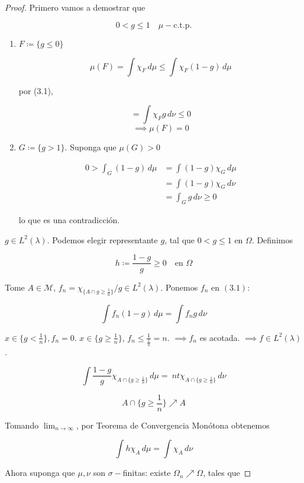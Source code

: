\begin{proof}
    Primero vamos a demostrar que 

    \[0<g\leq 1\quad \mu-\text{c.t.p.}\]

    \begin{enumerate}[label=(\alph*)]
        \item $F\coloneqq \{g\leq 0\}$
        
        \[\mu(F)=\int \chi_F\,d\mu\leq \int \chi_F (1-g)\,d\mu\]

        por (3.1), 

        \[=\int\chi_F g\,d\nu\leq 0\]
        \[\implies \mu(F)=0\]

        \item $G\coloneqq \{g>1\}$. Suponga que $\mu(G)>0$
        
        \begin{align*}
            0>\int_G (1-g)\,d\mu&=\int (1-g)\chi_G\,d\mu\\
            &=\int (1-g)\chi_G\,d\nu\\
            &=\int_G g\,d\nu\geq 0
        \end{align*}

        lo que es una contradicción.

    \end{enumerate}

    $g\in L^2(\lambda)$. Podemos elegir representante $g$, tal que $0<g\leq 1$ en $\Omega$. Definimos 

    \[h\coloneqq \frac{1-g}{g}\geq 0\quad \text{en }\Omega\]

    Tome $A\in\mathcal{M}$, $f_n=\chi_{\{A\cap g\geq \frac{1}{n}\}}/g\in L^2(\lambda)$. Ponemos $f_n$ en $(3.1)$:

    \[\int f_n(1-g)\,d\mu=\int f_ng\,d\nu\]

    $x\in \{g<\frac{1}{n}\},f_n=0$. $x\in \{g\geq \frac{1}{n}\}$, $f_n\leq \frac{1}{\frac{1}{n}}=n$. $\implies f_n$ es acotada. $\implies f\in L^2(\lambda)$.

    \[\int \frac{1-g}{g}\chi_{A\cap\{g\geq \frac{1}{n}\}}\,d\mu=\ nt \chi_{A\cap \{g\geq \frac{1}{n}\}}\,d\nu\]

    \[A\cap\{g\geq\frac{1}{n}\}\nearrow A\]

    Tomando $\lim_{n\to\infty}$, por Teorema de Convergencia Monótona obtenemos 

    \[\int h\chi_A\,d\mu=\int\chi_A\,d\nu\]

    Ahora suponga que $\mu,\nu$ son $\sigma-$finitas: existe $\Omega_n\nearrow \Omega$, tales que 


\end{proof}
